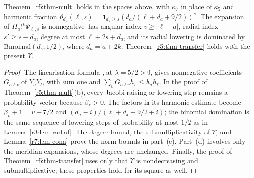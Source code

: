 \begin{lemma}\label{r7:lem-mult}
Theorem~\ref{r5:thm-mult} holds in the spaces above, with $\kappa_7$ in place of $\kappa_5$ and harmonic fraction
$\vartheta_{d_a}(\ell,s)=\mathbf1_{d_a\geq s}(d_a/(\ell+d_a+9/2))^s$. The expansion of $H_at^k\Psi_{\ell,s}$ is nonnegative, has angular index $v\geq|\ell-a|$, radial index $s'\geq s-d_a$, degree at most $\ell+2s+d_a$, and its radial lowering is dominated by $\mathrm{Binomial}(d_a,1/2)$, where $d_a=a+2k$. Theorem~\ref{r5:thm-transfer} holds with the present $\Upsilon$.
\end{lemma}
\begin{proof}
The linearisation formula \cite[18.18.22]{DLMF}, at $\lambda=5/2>0$, gives nonnegative coefficients $G_{a\ell v}$ of $Y_aY_\ell$, with sum one and $\sum_vG_{a\ell v}h_v\leq h_ah_\ell$. In the proof of Theorem~\ref{r5:thm-mult}(b), every Jacobi raising or lowering step remains a probability vector because $\beta_\ell>0$. The factors in its harmonic estimate become $\beta_v+1=v+7/2$ and $(d_a-i)/(\ell+d_a+9/2+i)$; the binomial domination is the same sequence of lowering steps of probability at most $1/2$ as in Lemma~\ref{r3:lem-radial}. The degree bound, the submultiplicativity of $\Upsilon$, and Lemma~\ref{r7:lem-conn} prove the norm bounds in part~(c). Part~(d) involves only the meridian expansions, whose degrees are unchanged. Finally, the proof of Theorem~\ref{r5:thm-transfer} uses only that $\Upsilon$ is nondecreasing and submultiplicative; these properties hold for its square as well.
\end{proof}

